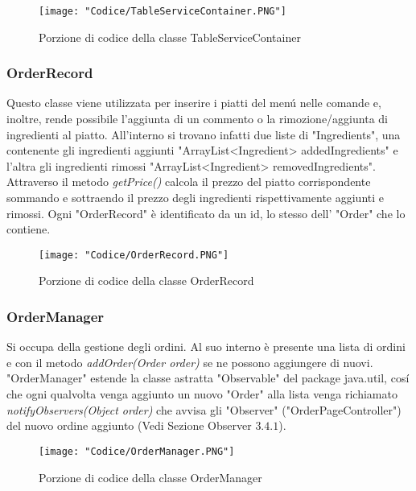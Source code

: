 \documentclass{article}
\begin{document}
\begin{figure}[!h]
\centering
\texttt{[image: "Codice/TableServiceContainer.PNG"]}
\caption{Porzione di codice della classe TableServiceContainer}
\end{figure}

\newpage

\subsubsection{OrderRecord}

Questo classe viene utilizzata per inserire i piatti del men\'u nelle comande e, inoltre, rende possibile l'aggiunta di un commento o la rimozione/aggiunta di ingredienti al piatto. All'interno si trovano infatti due liste di "Ingredients", una contenente gli ingredienti aggiunti "ArrayList<Ingredient> addedIngredients" e l'altra gli ingredienti rimossi "ArrayList<Ingredient> removedIngredients". Attraverso il metodo \textit{getPrice()} calcola il prezzo del piatto corrispondente sommando e sottraendo il prezzo degli ingredienti rispettivamente aggiunti e rimossi. Ogni "OrderRecord" è identificato da un id, lo stesso dell' "Order" che lo contiene.


\begin{figure}[!h]
\centering
\texttt{[image: "Codice/OrderRecord.PNG"]}
\caption{Porzione di codice della classe OrderRecord}
\end{figure}

\subsubsection{OrderManager}

Si occupa della gestione degli ordini. Al suo interno è presente una lista di ordini e con il metodo \textit{addOrder(Order order)} se ne possono aggiungere di nuovi. "OrderManager" estende la classe astratta "Observable" del package java.util, cos\'i che ogni qualvolta venga aggiunto un nuovo "Order" alla lista venga richiamato \textit{notifyObservers(Object order)} che avvisa gli "Observer" ("OrderPageController") del nuovo ordine aggiunto (Vedi Sezione Observer $3.4.1 $). 

\newpage

\begin{figure}[!h]
\centering
\texttt{[image: "Codice/OrderManager.PNG"]}
\caption{Porzione di codice della classe OrderManager}
\end{figure}
\end{document}
